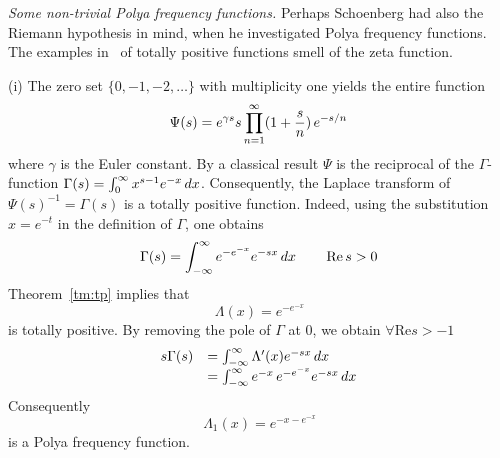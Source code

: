 \documentclass{article}
\newcommand{\tmem}[1]{{\em #1\/}}
\providecommand{\*}{{\opl}}
\newcommand{\<}{}
\newcommand{\>}{}
\newcommand{\inv}{^{- 1}}
\newcommand{\tp}{totally positive}
\newcommand{\pff}{Polya frequency function}
\begin{document}
{\tmem{Some non-trivial {\pff}s.}} Perhaps Schoenberg had also the Riemann
hypothesis in mind, when he investigated Polya frequency functions. The
examples in~{\cite{sch47,sch51}} of {\tp} functions smell of the zeta
function.

(i) The zero set $\{0, - 1, - 2, \ldots\}$ with multiplicity one yields the
entire function
\begin{equation}
  \label{eq:n1} \Psi (s) = e^{\gamma s} s \prod_{n = 1}^{\infty} (1 +
  \frac{s}{n})  \hspace{0.17em} e^{- s / n} \hspace{0.17em}
\end{equation}
where $\gamma$ is the Euler constant. By a classical result $\Psi$ is the
reciprocal of the $\Gamma$-function $\Gamma (s) = \int_0^{\infty} x^{s - 1}
e^{- x}  \hspace{0.17em} dx$. Consequently, the Laplace transform of $\Psi (s)
\inv = \Gamma (s)$ is a {\tp} function. Indeed, using the substitution $x =
e^{- t}$ in the definition of $\Gamma$, one obtains
\begin{equation}
  \label{eq:n2} \Gamma (s) = \int_{- \infty}^{\infty} e^{- e^{- x}} e^{- sx} 
  \hspace{0.17em} dx \hspace{0.17em} \qquad \mathrm{Re} \hspace{0.17em} s > 0
  \hspace{0.17em}
\end{equation}
Theorem~\ref{tm:tp} implies that
\[ \Lambda (x) = e^{- e^{- x}} \]
is {\tp}. By removing the pole of $\Gamma$ at $0$, we obtain $\forall
\mathrm{Re} s > - 1$
\begin{equation}
  \begin{array}{ll}
    s \Gamma (s) & = \int_{- \infty}^{\infty} \Lambda' (x) e^{- sx} 
    \hspace{0.17em} dx\\
    & = \int_{- \infty}^{\infty} e^{- x}  \hspace{0.17em} e^{- e^{- x}} e^{-
    sx}  \hspace{0.17em} dx \hspace{0.17em}
  \end{array}
\end{equation}
Consequently
\begin{equation}
  \Lambda_1 (x) = e^{- x - e^{- x}}
\end{equation}
is a {\pff}.
\end{document}
